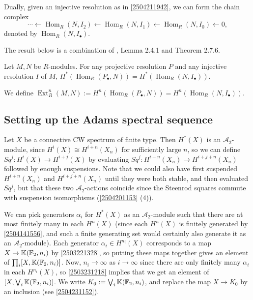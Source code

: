\documentclass{MetricNotes2023}
\def\bb{\ensuremath\mathbb}
\def\A{\ensuremath{\mathscr{A}_2}}
\DeclareMathOperator{\Ext}{Ext}
\DeclareMathOperator{\Hom}{Hom}
\def\textcolour{\textcolor}
\begin{document}
Dually, given an injective resolution as in \ref{2504211942}, we can form the chain complex
\[\cdots \leftarrow \Hom_R(N, I_2) \leftarrow \Hom_R(N, I_1) \leftarrow \Hom_R(N, I_0)\leftarrow 0,\]
denoted by \(\Hom_R(N, I_\bullet)\).

The result below is a combination of \autocite{weibel}, Lemma 2.4.1 and Theorem 2.7.6. 

\begin{proposition}
Let \(M, N\) be \(R\)-modules. For any projective resolution \(P\) and any injective resolution \(I\) of \(M\), \(H^*(\Hom_R(P_\bullet, N))=H^*(\Hom_R(N,I_\bullet))\).
\end{proposition}

We define \(\Ext^{n}_R(M,N):=H^n(\Hom_R(P_\bullet, N))=H^n(\Hom_R(N, I_\bullet))\). 

\subsection{Setting up the Adams spectral sequence}\label{2504291248}

Let \(X\) be a connective CW spectrum of finite type. Then \(H^*(X)\) is an \(\A\)-module, since \(H^i(X)\cong H^{i+n}(X_n)\) for sufficiently large \(n\), so we can define \(Sq^j : H^i(X)\to H^{i+j}(X)\) by evaluating \(Sq^j : H^{i+n}(X_n)\to H^{i+j+n}(X_n)\) followed by enough suspensions. Note that we could also have first suspended \(H^{i+n}(X_n)\) and \(H^{i+j+n}(X_n)\) until they were both stable, and then evaluated \(Sq^j\), but that these two \(\A\)-actions coincide since the Steenrod squares commute with suspension isomorphisms (\ref{2504201153} (4)). %

We can pick generators \(\alpha_i\) for \(H^*(X)\) as an \(\mathscr{A}_2\)-module such that there are at most finitely many in each \(H^n(X)\) (since each \(H^n(X)\) is finitely generated by \ref{2504141556}, and such a finite generating set would certainly also generate it as an \(\A\)-module). Each generator \(\alpha_i\in H^{n_i}(X)\) corresponds to a map \(X \to \bb{K}(\bb{F}_2, n_i)\) by \ref{2503221328}, so putting these maps together gives an element of \(\prod_i [X, \bb{K}(\bb{F}_2, n_i)]\). Now, \(n_i \to\infty\) as \(i\to \infty\) since there are only finitely many \(\alpha_i\) in each \(H^{n_i}(X)\), so \ref{2503231218} implies that we get an element of \([X, \bigvee_i \bb{K}(\bb{F}_2, n_i)]\).  We write \(K_0 := \bigvee_i \bb{K}(\bb{F}_2, n_i)\), and replace the map \(X \to K_0\) by an inclusion (see \ref{2504231152}).
\end{document}
